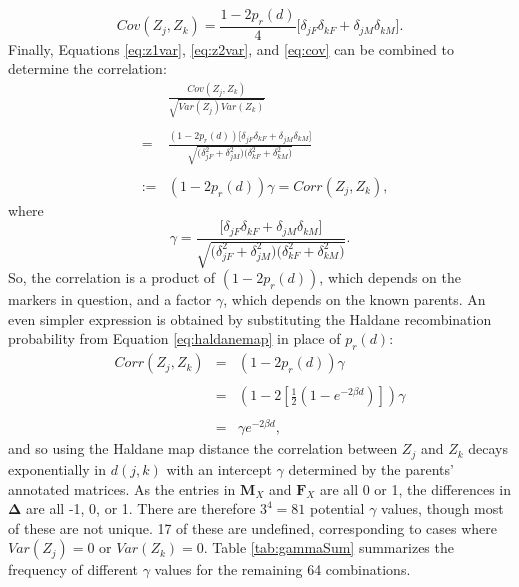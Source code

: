 \documentclass[12pt]{article}
\newcommand{\m}[1]{\mathbf{#1}}               %
\newcommand{\sm}[1]{\boldsymbol{#1}}   %
\begin{document}
\begin{equation} \label{eq:cov}
  Cov(Z_j, Z_k) = \frac{1 - 2 p_r(d)}{4} \Big [ \delta_{jF} \delta_{kF} + \delta_{jM} \delta_{kM} \Big ]. 
\end{equation}
Finally, Equations \ref{eq:z1var}, \ref{eq:z2var}, and \ref{eq:cov} can be combined to determine the correlation:
\begin{eqnarray} \label{eq:precorr}
    & & \frac{Cov(Z_j, Z_k)}{\sqrt{Var(Z_j) Var(Z_k)}} \nonumber\\
    & & \nonumber\\
    & = & \frac{ (1 - 2 p_r(d)) \Big [ \delta_{jF} \delta_{kF} + \delta_{jM} \delta_{kM} \Big ] }{  \sqrt{ \big ( \delta_{jF}^2 + \delta_{jM}^2 \big ) \big ( \delta_{kF}^2 + \delta_{kM}^2 \big )}} \nonumber\\
    & & \nonumber \\
    & := & (1 - 2 p_r(d)) \gamma = Corr(Z_j, Z_k),
\end{eqnarray}
where
\begin{equation} \label{eq:gammaDef}
\gamma = \frac{ \Big [ \delta_{jF} \delta_{kF} + \delta_{jM} \delta_{kM} \Big ] }{  \sqrt{ \big ( \delta_{jF}^2 + \delta_{jM}^2 \big ) \big ( \delta_{kF}^2 + \delta_{kM}^2 \big )}}.
\end{equation}
So, the correlation is a product of $(1-2 p_r(d))$, which depends on the markers in question, and a factor $\gamma$, which depends on the known parents. An even simpler expression is obtained by substituting the Haldane recombination probability from Equation \ref{eq:haldanemap} in place of $p_r(d)$:
\begin{eqnarray} \label{eq:corrdist}
    Corr(Z_j, Z_k) & = & (1 - 2 p_r(d)) \gamma \nonumber\\
    & & \nonumber\\
    & = & \left ( 1 - 2 \left [ \frac{1}{2} \left ( 1 - e^{-2 \beta d} \right ) \right ] \right ) \gamma \nonumber\\
    & & \nonumber\\
    & = & \gamma e^{-2 \beta d},
\end{eqnarray}
and so using the Haldane map distance the correlation between $Z_j$ and $Z_k$ decays exponentially in $d(j,k)$ with an intercept $\gamma$ determined by the parents' annotated matrices. As the entries in $\m{M}_X$ and $\m{F}_X$ are all 0 or 1, the differences in $\sm{\Delta}$ are all -1, 0, or 1. There are therefore $3^4 = 81$ potential $\gamma$ values, though most of these are not unique. 17 of these are undefined, corresponding to cases where $Var(Z_j) = 0$ or $Var(Z_k) = 0$. Table \ref{tab:gammaSum} summarizes the frequency of different $\gamma$ values for the remaining 64 combinations.
\end{document}
